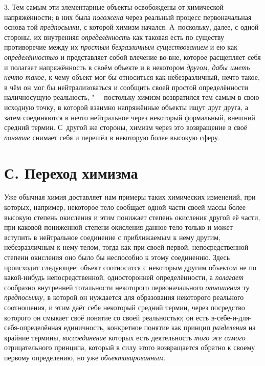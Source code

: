 3. Тем самым эти элементарные объекты освобождены от
химической напряжённости; в них была
{\em положена} через
реальный процесс первоначальная основа той
{\em предпосылки,} с
которой химизм начался. А~поскольку, далее, с одной стороны, их внутренняя
{\em определённость} как
таковая есть по существу противоречие между их
{\em простым безразличным
существованием} и ею как
{\em определённостью} и
представляет собой влечение во-вне, которое расщепляет себя и полагает
напряжённость в своём объекте и в некотором
{\em другом,}
{\em дабы иметь нечто такое,}
к чему объект мог бы относиться как небезразличный, нечто
такое, в чём он мог бы нейтрализоваться и сообщить своей простой
определённости наличносущую реальность, "--- постольку химизм
возвратился тем самым в свою исходную точку, в которой взаимно напряжённые
объекты ищут друг друга, а затем соединяются в нечто нейтральное через
некоторый формальный, внешний средний термин. С~другой же стороны, химизм
через это возвращение в своё
{\em понятие} снимает
себя и перешёл в некоторую более высокую сферу.

\section[С. Переход химизма]{С. Переход химизма}

Уже обычная химия доставляет нам примеры таких химических
изменений, при которых, например, некоторое тело сообщает одной части своей
массы более высокую степень окисления и этим понижает степень окисления
другой её части, при каковой пониженной степени окисления данное тело
только и может вступить в нейтральное соединение с приближаемым к нему
другим, небезразличным к нему телом, тогда как при своей первой,
непосредственной степени окисления оно было бы неспособно к этому
соединению. Здесь происходит следующее: объект соотносится с некоторым
другим объектом не по какой-нибудь непосредственной, односторонней
определённости, а {\em полагает}
сообразно внутренней тотальности некоторого
первоначального {\em отношения}
ту {\em предпосылку,}
в которой он нуждается для образования некоторого реального
соотношения, и этим даёт себе некоторый средний термин, через посредство
которого он смыкает своё понятие со своей реальностью; он есть
в-себе-и-для-себя-определённая единичность, конкретное понятие
как принцип {\em разделения}
на крайние термины,
{\em воссоединение}
которых есть деятельность
{\em того же самого}
отрицательного принципа, который в силу этого возвращается
обратно к своему первому определению, но уже
{\em объективированным}.

